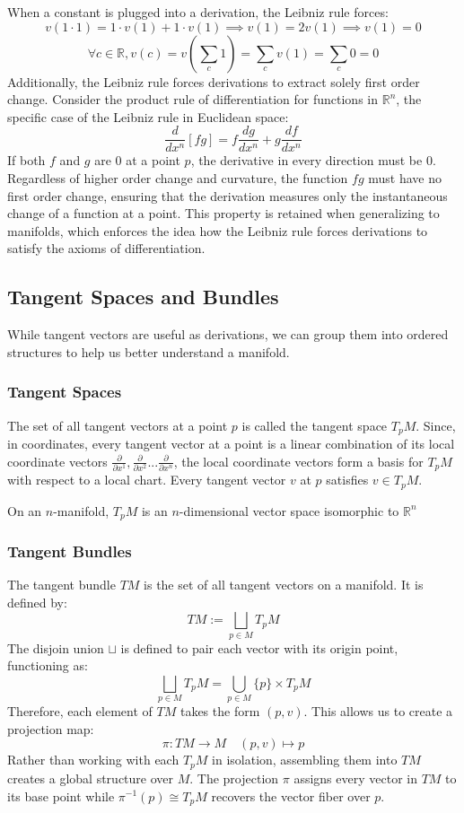 \documentclass[12pt]{article}
\newcommand{\R}{\mathbb{R}}
\newcommand{\p}{\partial}
\begin{document}
When a constant is plugged into a derivation, the Leibniz rule forces:
\[
v(1\cdot1) = 1\cdot v(1)+1\cdot v(1) \implies v(1)=2v(1) \implies v(1)=0
\]
\[
\forall c\in\R, v(c)=v(\sum_{c}{1}) = \sum_{c}{v(1)} = \sum_{c}{0} = 0
\]
Additionally, the Leibniz rule forces derivations to extract solely first order change. Consider the product rule of differentiation for functions in $\R^n$, the specific case of the Leibniz rule in Euclidean space:
\[
\frac{d}{dx^n}\left[fg\right] =f\frac{dg}{dx^n}+g\frac{df}{dx^n}
\]
If both $f$ and $g$ are 0 at a point $p$, the derivative in every direction must be 0. Regardless of higher order change and curvature, the function $fg$ must have no first order change, ensuring that the derivation measures only the instantaneous change of a function at a point. This property is retained when generalizing to manifolds, which enforces the idea how the Leibniz rule forces derivations to satisfy the axioms of differentiation.

\subsection{Tangent Spaces and Bundles}

 While tangent vectors are useful as derivations, we can group them into ordered structures to help us better understand a manifold.

\subsubsection{Tangent Spaces}
The set of all tangent vectors at a point $p$ is called the tangent space $T_pM$. Since, in coordinates, every tangent vector at a point is a linear combination of its local coordinate vectors $\frac{\p}{\p x^1},\frac{\p}{\p x^2}...\frac{\p}{\p x^n} $, the local coordinate vectors form a basis for $T_pM$ with respect to a local chart. Every tangent vector $v$ at $p$ satisfies $v \in T_pM$.

On an $n$-manifold, $T_pM$ is an $n$-dimensional vector space isomorphic to $\R^n$

\subsubsection{Tangent Bundles}
The tangent bundle $TM$ is the set of all tangent vectors on a manifold. It is defined by: \[
TM :=\bigsqcup_{p\in M}{T_pM}
\]
The disjoin union $\sqcup$ is defined to pair each vector with its origin point, functioning as:
\[
\bigsqcup_{p\in M}{T_pM} = \bigcup_{p\in M}{\{p\} \times T_pM}
\]
Therefore, each element of $TM$ takes the form $(p,v)$. This allows us to create a projection map:
\[
\pi:TM \to M \quad(p,v) \mapsto p
\]
Rather than working with each $T_pM$ in isolation, assembling them into $TM$ creates a global structure over $M$. The projection $\pi$ assigns every vector in $TM$ to its base point while $\pi^{-1}(p) \cong T_pM$ recovers the vector fiber over $p$. 
\end{document}

